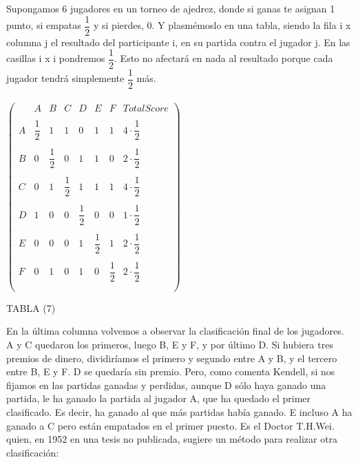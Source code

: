 \documentclass[a4paper]{article}
\begin{document}
	Supongamos 6 jugadores en un torneo de ajedrez, donde si ganas te asignan 1 punto, si empatas $\dfrac{1}{2}$ y si pierdes, 0. Y plasmémoslo en una tabla, siendo la fila i x columna j el resultado del participante i, en su partida contra el jugador j. En las casillas i x i pondremos $\dfrac{1}{2}$. Esto no afectará en nada al resultado porque cada jugador tendrá simplemente $\dfrac{1}{2}$ más.\\\\
	
\hspace{3cm}$\begin{pmatrix}
     & A & B & C & D & E & F  & Total Score\\ \\
   A & \dfrac{1}{2} & 1 & 1 & 0 & 1 & 1 & 4\cdot\dfrac{1}{2}\\ \\
   B & 0 & \dfrac{1}{2} & 0 & 1 & 1 & 0 & 2\cdot\dfrac{1}{2}\\\\
   C & 0 & 1 & \dfrac{1}{2} & 1 & 1 & 1 & 4\cdot\dfrac{1}{2}\\\\
   D & 1 & 0 & 0 & \dfrac{1}{2} & 0 & 0 & 1\cdot\dfrac{1}{2}\\\\
   E & 0 & 0 & 0 & 1 & \dfrac{1}{2} & 1 & 2\cdot\dfrac{1}{2}\\\\
   F & 0 & 1 & 0 & 1 & 0 & \dfrac{1}{2} & 2\cdot\dfrac{1}{2}\\\\
\end{pmatrix}$\\

	\begin{center}
	TABLA (7)
	\end{center}
	
	En la última columna volvemos a observar la clasificación final de los jugadores. A y C quedaron los primeros, luego B, E y F, y por último D. Si hubiera tres premios de dinero, dividiríamos el primero y segundo entre A y B, y el tercero entre B, E y F. D se quedaría sin premio. Pero, como comenta Kendell, si nos fijamos en las partidas ganadas y perdidas, aunque D sólo haya ganado una partida, le ha ganado la partida al jugador A, que ha quedado el primer clasificado. Es decir, ha ganado al que más partidas había ganado. E incluso A ha ganado a C pero están empatados en el primer puesto. Es el Doctor T.H.Wei. quien, en 1952 en una tesis no publicada, sugiere un método para realizar otra clasificación:\\
	
\end{document}
